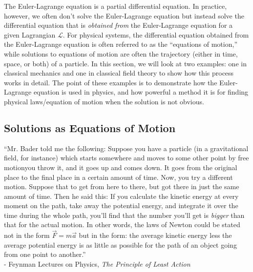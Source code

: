 \documentclass{article}
\newcommand{\lag}{\mathcal{L}}
\begin{document}
The Euler-Lagrange equation is a partial differential equation. In practice, however, we often don't solve the Euler-Lagrange equation but instead solve the differential equation that is \textit{obtained from} the Euler-Lagrange equation for a given Lagrangian $\lag$. For physical systems, the differential equation obtained from the Euler-Lagrange equation is often referred to as the ``equations of motion,'' while solutions to equations of motion are often the trajectory (either in time, space, or both) of a particle. In this section, we will look at two examples: one in classical mechanics and one in classical field theory to show how this process works in detail. The point of these examples is to demonstrate how the Euler-Lagrange equation is used in physics, and how powerful a method it is for finding physical laws/equation of motion when the solution is not obvious. 

\subsection{Solutions as Equations of Motion}

\begin{displayquote}
	``Mr. Bader told me the following: Suppose you have a particle (in a gravitational field, for instance) which starts somewhere and moves to some other point by free motion\textemdash you throw it, and it goes up and comes down. It goes from the original place to the final place in a certain amount of time. Now, you try a different motion. Suppose that to get from here to there, but got there in just the same amount of time. Then he said this: If you calculate the kinetic energy at every moment on the path, take away the potential energy, and integrate it over the time during the whole path, you'll find that the number you'll get is \textit{bigger} than that for the actual motion. In other words, the laws of Newton could be stated not in the form $\vec{F}=m\vec{a}$ but in the form: the average kinetic energy less the average potential energy is as little as possible for the path of an object going from one point to another.'' \\
	- Feynman Lectures on Physics, \textit{The Principle of Least Action}\cite{FEYN}
\end{displayquote}
\end{document}
